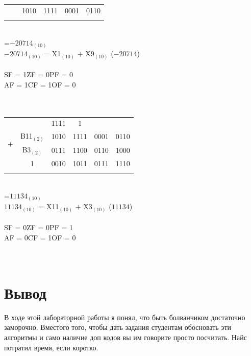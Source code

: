 \documentclass[11pt]{article}
\begin{document}
\begin{paracol}{2}
\begin{enumerate}
\begin{tabular}[t]{cccccc}
			\cline{2-6}
						       &        & 1010 & 1111 & 0001 & 0110\\
		\\
		\end{tabular}\\
		=$ -20714_{(10)}$\\
		\phantom{=}$ -20714_{(10)}$  = X1$_{(10)}$ $+$ X9$_{(10)}$ ($-20714$)\\\\
		SF = 1\qquad ZF = 0\qquad PF = 0 \\
		AF = 1\qquad CF = 1\qquad OF = 0\\\\\\
		\begin{tabular}[t]{cccccc}
			&       &                                                1111&1\phantom{111}   &&\\
			\multirow{2}{*}{$+$} & B11$_{(2)}$ & 1010 & 1111 & 0001 & 0110\\
						          & B3$_{(2)}$\phantom{1} &  0111 &  1100 & 0110 & 1000\\
			\cline{2-6}
						       &        1& 0010 & 1011 & 0111 & 1110\\
		\\
		\end{tabular}\\
		=$11134_{(10)}$\\
		\phantom{=}$ 11134_{(10)}$  = X11$_{(10)}$ $+$ X3$_{(10)}$ ($11134$)\\\\
		SF = 0\qquad ZF = 0\qquad PF = 1\\
		AF = 0\qquad CF = 1\qquad OF = 0\\\\\\
\end{enumerate}
\end{paracol}
\section{Вывод}
В ходе этой лабораторной работы я понял, что быть болванчиком достаточно заморочно. Вместого того, чтобы дать задания студентам
обосновать эти алгоритмы и само наличие доп кодов вы им говорите просто посчитать. Найс потратил время, если коротко.
\end{document}
